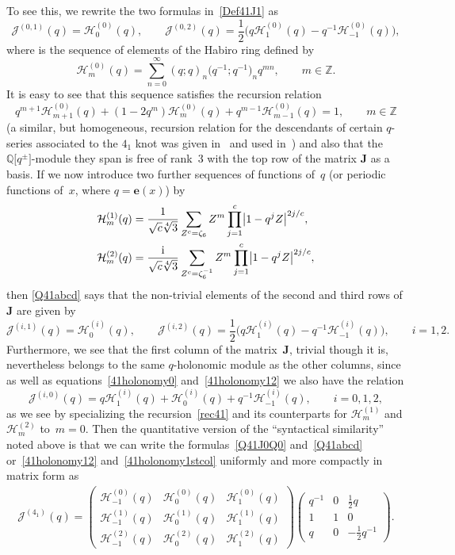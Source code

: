 \documentclass[pdftex]{sigma}
\numberwithin{equation}{section}
\def\BZ{\mathbb Z}
\def\BQ{\mathbb Q}
\def\z{\zeta}
\def\e{\mathbf{e}}
\def\Z{\mathbb Z}
\def\m{ - }
\def\i{^{-1}}
\def\e{\mathbf{e}}
\def\z{\zeta}
\def\be{\begin{equation}}
\def\ee{\end{equation}}
\def\bJ{J} \def\bJ{\mathbf{J}}
\def\sJ{\mathcal{J}}
\def\sH{\mathcal H} %
\begin{document}
To see this, we rewrite the two formulas in~\eqref{Def41J1} as
\be
\label{41holonomy0}
\sJ^{(0,1)}(q)=\sH^{(0)}_0(q) ,\qquad
\sJ^{(0,2)}(q)=\frac12\bigl(q\sH^{(0)}_1(q)-q\i\sH^{(0)}_{-1}(q)\bigr) ,
\ee
where \smash{$\big\{\sH^{(0)}_m(q)\big\}_{m\in\Z}$} is the sequence of elements of the Habiro
ring defined by
\be
\label{qHol41}
\sH^{(0)}_m(q) = \sum_{n=0}^\infty (q;q)_n \big(q^{-1};q^{-1}\big)_n q^{m n},
\qquad m\in\Z.
\ee
It is easy to see that this sequence satisfies the recursion relation
\be
\label{rec41}
q^{m+1} \sH^{(0)}_{m+1}(q) + (1-2 q^m) \sH^{(0)}_{m}(q)
+ q^{m-1} \sH^{(0)}_{m-1}(q) = 1,
\qquad m \in \BZ
\ee
(a similar, but homogeneous, recursion relation for the descendants of certain
$q$-series associated to the $4_1$ knot was given in~\cite[equation~(14)]{GGM} and
used in~\cite{GZ:qseries}) and also that the~$\BQ\big[q^\pm\big]$-module they span is
free of rank~3 with the top row of the matrix $\bJ$ as a basis. If we now introduce
two further sequences of functions of~$q$ (or periodic functions of~$x$, where
$q=\e(x)$) by
\begin{align}
\sH^{(1)}_m(q) &= \frac{1}{\sqrt c \sqrt[4]{3}}
\sum_{Z^c = \z_6} Z^m \prod_{j=1}^c \bigl|1\m q^jZ\bigr|^{2j/c} ,\nonumber
\\
\sH^{(2)}_m(q) &= \frac{\rm i}{\sqrt c \sqrt[4]{3}}
 \sum_{Z^c = \z_6^{-1}} Z^m \prod_{j=1}^c \bigl|1\m q^jZ\bigr|^{2j/c} ,\label{41holonomy12}
\end{align}
then \eqref{Q41abcd} says that the non-trivial elements of the
second and third rows of $\bJ$ are given by
\[%
\sJ^{(i,1)}(q)=\sH_0^{(i)}(q) ,\qquad
\sJ^{(i,2)}(q)=\frac12\bigl(q\sH^{(i)}_1(q)-q\i\sH^{(i)}_{-1}(q)\bigr),
\qquad i=1,2 .
\]
Furthermore, we see that the first column of the matrix~$\bJ$, trivial
though it is, nevertheless belongs to the same $q$-holonomic module as the
other columns, since as well as equations~\eqref{41holonomy0}
and~\eqref{41holonomy12} we also have the relation
\be
\label{41holonomy1stcol}
\sJ^{(i,0)}(q)=
q \sH^{(i)}_1(q) + \sH^{(i)}_0(q) + q\i \sH^{(i)}_{-1}(q), \qquad i=0,1,2 ,
\ee
as we see by specializing the recursion~\eqref{rec41} and its counterparts for
$\sH^{(1)}_m$ and $\sH^{(2)}_m$ \hbox{to~$m=0$}. Then the quantitative version of the
``syntactical similarity'' noted above is that we can write the formulas~\eqref{Q41J0Q0}
and~\eqref{Q41abcd} or~\eqref{41holonomy12} and~\eqref{41holonomy1stcol} uniformly and
more compactly in matrix form as
\begin{gather}
\label{41matrixholonomy}
\sJ^{(4_1)}(q) =
\begin{pmatrix} \sH^{(0)}_{-1}(q) & \sH^{(0)}_0(q) &\sH^{(0)}_1(q) \\
 \sH^{(1)}_{-1}(q) & \sH^{(1)}_0(q) &\sH^{(1)}_1(q) \\
 \sH^{(2)}_{-1}(q) & \sH^{(2)}_0(q) &\sH^{(2)}_1(q) \end{pmatrix}
\begin{pmatrix} q^{-1} & 0 & \frac12 q \\ 1 & 1 & 0 \\ q & 0 & -\frac12 q^{-1}
\end{pmatrix} .
\end{gather}
\end{document}
